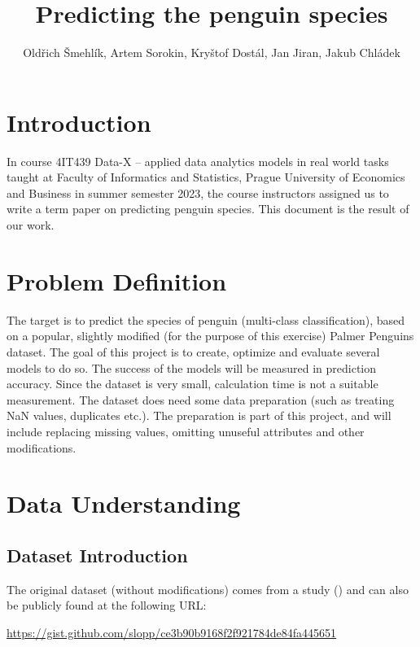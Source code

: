 \documentclass[12pt,a4paper]{article}
\title{Predicting the penguin species}
\author{Oldřich Šmehlík, Artem Sorokin, Kryštof Dostál, Jan Jiran, Jakub Chládek}
\begin{document}
\maketitle


\section{Introduction}

In course 4IT439 Data-X – applied data analytics models in real world tasks
taught at Faculty of Informatics and Statistics, Prague University
of Economics and Business in summer semester 2023,
the course instructors assigned us to write a term paper on predicting penguin species.
This document is the result of our work.

\section{Problem Definition}

The target is to predict the species of penguin (multi-class classification), based on a popular, slightly modified (for the purpose of this exercise) Palmer Penguins dataset.
The goal of this project is to create, optimize and evaluate several models to do so. The success of the models will be measured in prediction accuracy. Since the dataset is very small, calculation time is not a suitable measurement.
The dataset does need some data preparation (such as treating NaN values, duplicates etc.). The preparation is part of this project, and will include replacing missing values, omitting unuseful attributes and other modifications.

\section{Data Understanding}

\subsection{Dataset Introduction}

The original dataset (without modifications) comes from a study (\cite{10.1371/journal.pone.0090081}) and can also be publicly found at the following URL: 

\medskip
\noindent
\url{https://gist.github.com/slopp/ce3b90b9168f2f921784de84fa445651}
\medskip
\end{document}
